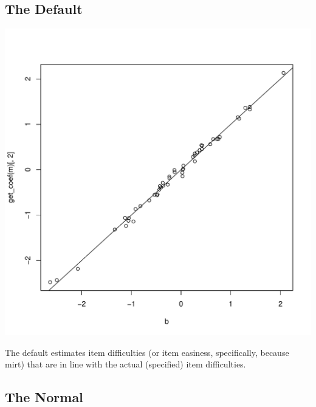 \documentclass{article}\usepackage[]{graphicx}\usepackage[]{color}
\makeatletter
\def\maxwidth{ %
  \ifdim\Gin@nat@width>\linewidth
    \linewidth
  \else
    \Gin@nat@width
  \fi
}
\newenvironment{kframe}{%
 \def\at@end@of@kframe{}%
 \ifinner\ifhmode%
  \def\at@end@of@kframe{\end{minipage}}%
  \begin{minipage}{\columnwidth}%
 \fi\fi%
 \def\FrameCommand##1{\hskip\@totalleftmargin \hskip-\fboxsep
 \colorbox{shadecolor}{##1}\hskip-\fboxsep
     \hskip-\linewidth \hskip-\@totalleftmargin \hskip\columnwidth}%
 \MakeFramed {\advance\hsize-\width
   \@totalleftmargin\z@ \linewidth\hsize
   \@setminipage}}%
 {\par\unskip\endMakeFramed%
 \at@end@of@kframe}
\newenvironment{knitrout}{}{} %
\makeatother
\begin{document}
\subsection{The Default}
\begin{knitrout}
\color{fgcolor}\begin{kframe}


{\ttfamily\noindent\itshape\color{messagecolor}{\#\# Loading required package: stats4}}

{\ttfamily\noindent\itshape\color{messagecolor}{\#\# Loading required package: lattice}}\end{kframe}
\includegraphics[width=\maxwidth]{figure/unnamed-chunk-5-1} 

\end{knitrout}

The default estimates item difficulties (or item easiness, specifically, because mirt) that are in line with the actual (specified) item difficulties.

\subsection{The Normal}
\end{document}
